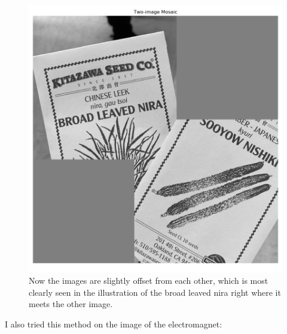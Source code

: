 \documentclass[]{article}
\begin{document}
\begin{figure}[H]
	\centering
	\includegraphics[width=6.5in]{p3_output/img_3_mosaic_lp.png}
	\caption{Now the images are slightly offset from each other, which is most clearly seen in the illustration of the broad leaved nira right where it meets the other image.}
\end{figure}

\newpage
I also tried this method on the image of the electromagnet:
\end{document}
